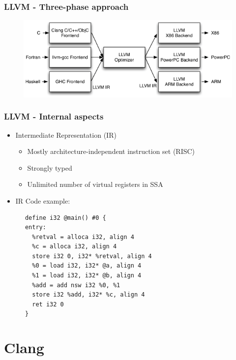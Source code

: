 \documentclass{smilebeamer}
\begin{document}
\begin{frame}
\frametitle{LLVM - Three-phase approach}
\begin{figure}
\includegraphics[width=1\linewidth]{img/llvm_struct.png}
\end{figure}
\end{frame}

\begin{frame}[fragile]
\frametitle{LLVM - Internal aspects}
\begin{itemize}
  \item Intermediate Representation (IR)
  \begin{itemize}
    \item Mostly architecture-independent instruction set (RISC)
    \item Strongly typed
    \item Unlimited number of virtual registers in SSA
  \end{itemize}
  \item IR Code example:
\end{itemize}

\begin{lstlisting}
      define i32 @main() #0 {
      entry:
        %retval = alloca i32, align 4
        %c = alloca i32, align 4
        store i32 0, i32* %retval, align 4
        %0 = load i32, i32* @a, align 4
        %1 = load i32, i32* @b, align 4
        %add = add nsw i32 %0, %1
        store i32 %add, i32* %c, align 4
        ret i32 0
      }
\end{lstlisting}
\end{frame}


\section{Clang}
\end{document}
